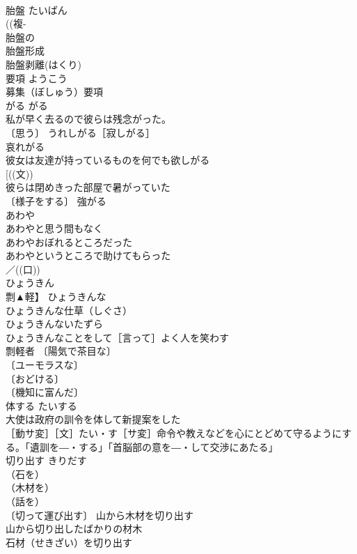 \documentclass[8pt]{extreport}
\begin{document}
\begin{CJK}{UTF8}{min}
\\	胎盤	たいばん	
\\	((複-
\\	胎盤の 
\\	胎盤形成 
\\	胎盤剥離(はくり) 
\\	要項	ようこう	
\\	募集（ぼしゅう）要項 
\\	がる	がる	
\\	私が早く去るので彼らは残念がった。 
\\	〔思う〕 うれしがる［寂しがる］ 
\\	哀れがる 
\\	彼女は友達が持っているものを何でも欲しがる 
\\	[((文))
\\	彼らは閉めきった部屋で暑がっていた 
\\	〔様子をする〕 強がる 
\\	あわや		
\\	あわやと思う間もなく 
\\	あわやおぼれるところだった 
\\	あわやというところで助けてもらった 
\\	／((口)) 
\\	ひょうきん	
\\	剽▲軽】	ひょうきんな 
\\	ひょうきんな仕草（しぐさ） 
\\	ひょうきんないたずら 
\\	ひょうきんなことをして［言って］よく人を笑わす 
\\	剽軽者 〔陽気で茶目な〕
\\	〔ユーモラスな〕
\\	〔おどける〕
\\	〔機知に富んだ〕
\\	体する	たいする	
\\	大使は政府の訓令を体して新提案をした 
\\	［動サ変］［文］たい・す［サ変］命令や教えなどを心にとどめて守るようにする。「遺訓を―・する」「首脳部の意を―・して交渉にあたる」
\\	切り出す	きりだす	
\\	（石を）
\\	（木材を）
\\	（話を）
\\	〔切って運び出す〕 山から木材を切り出す 
\\	山から切り出したばかりの材木 
\\	石材（せきざい）を切り出す 

\end{CJK}
\end{document}
